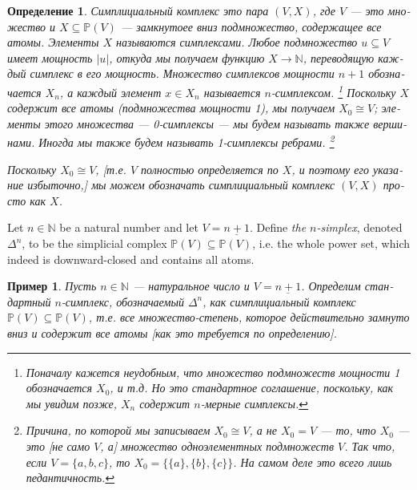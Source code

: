 \documentclass[a4paper]{book}
\def\PP{{\mathbb P}}
\def\NN{{\mathbb N}}
\def\to{\rightarrow}
\def\ss{\subseteq}
\def\iso{\cong}
\def\ul{\underline}
\theoremstyle{myth}
\newtheorem{exampleENG}[envENG]{\begin{english}Example\end{english}}
\newtheorem{exampleRUS}[envRUS]{Пример}
\newtheorem{definitionRUS}[envRUS]{Определение}
\begin{document}
\begin{russian}
\begin{definitionRUS}
{\em Симплициальный комплекс} это пара $(V,X)$, где $V$ — это множество и $X\ss\PP(V)$ — замкнутоее вниз подмножество, содержащее все атомы. Элементы $X$ называются {\em симплексами}. Любое подмножество $u\ss V$ имеет мощность $|u|$, откуда мы получаем функцию $X\to\NN$, переводящую каждый симплекс в его мощность. Множество симплексов мощности $n+1$ обозначается $X_n$, а каждый элемент $x\in X_n$ называется {\em $n$-симплексом}.%
\footnote{Поначалу кажется неудобным, что множество подмножеств мощности 1 обозначается $X_0$, и т.д. Но это стандартное соглашение, поскольку, как мы увидим позже, $X_n$ содержит $n$-мерные симплексы.}
Поскольку $X$ содержит все атомы (подмножества мощности 1), мы получаем $X_0\iso V$; элементы этого множества — 0-симплексы — мы будем называть также {\em вершинами}. Иногда мы также будем называть 1-симплексы {\em ребрами}.%
\footnote{Причина, по которой мы записываем $X_0\iso V$, а не $X_0=V$ — то, что $X_0$ — это [не само $V$, а] множество одноэлементных подмножеств $V$. Так что, если $V=\{a,b,c\}$, то $X_0=\{\{a\},\{b\},\{c\}\}$. На самом деле это всего лишь педантичность.}

Поскольку $X_0\iso V$, [т.е. $V$ полностью определяется по $X$, и поэтому его указание избыточно,] мы можем обозначать симплициальный комплекс $(V,X)$ просто как $X$.
\end{definitionRUS}

\begin{exampleENG}
Let $n\in\NN$ be a natural number and let $V=\ul{n+1}$. Define {\em the $n$-simplex}, denoted $\Delta^n$, to be the simplicial complex $\PP(V)\ss\PP(V)$, i.e. the whole power set, which indeed is downward-closed and contains all atoms. 
\end{exampleENG}

\begin{exampleRUS}
Пусть $n\in\NN$ — натуральное число и $V=\ul{n+1}$. Определим {\em стандартный $n$-симплекс},%
обозначаемый $\Delta^n$, как симплициальный комплекс $\PP(V)\ss\PP(V)$, т.е. все множество-степень, которое действительно замнуто вниз и содержит все атомы [как это требуется по определению]. 
\end{exampleRUS}


\end{russian}
\end{document}

